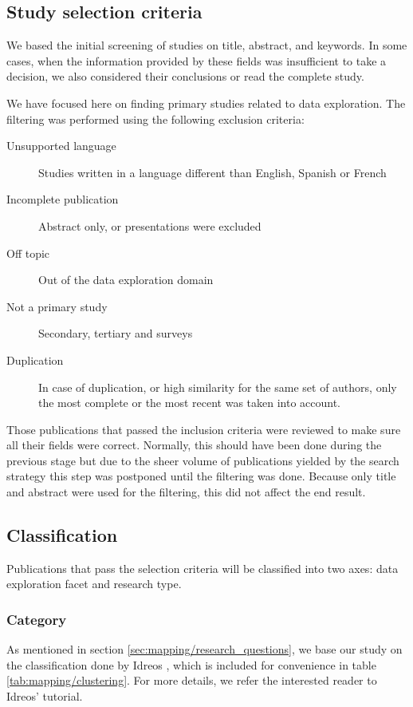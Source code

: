 
\subsection{Study selection criteria}
We based the initial screening of studies on title, abstract, and keywords.
In some cases, when the information provided by these fields was
insufficient to take a decision, we also considered their conclusions
or read the complete study.

We have focused here on finding primary studies related to data exploration.
The filtering was performed using the following exclusion criteria:

\begin{description}
  \item[Unsupported language] Studies written in a language different than
  English, Spanish or French
  \item[Incomplete publication] Abstract only, or presentations were excluded
  \item[Off topic] Out of the data exploration domain
  \item[Not a primary study] Secondary, tertiary and surveys
  \item[Duplication] In case of duplication, or high similarity for the same
  set of authors, only the most complete or the most recent was
  taken into account.
\end{description}

Those publications that passed the inclusion criteria were reviewed to make
sure all their fields were correct. Normally, this should have been done during
the previous stage but due to the sheer volume of publications yielded by the
search strategy this step was postponed until the filtering was done. Because only
title and abstract were used for the filtering, this did not affect the end
result.

\subsection{Classification}
Publications that pass the selection criteria will be classified into two axes:
data exploration facet and research type.

\subsubsection{Category}
As mentioned in section \ref{sec:mapping/research_questions}, we base our study on
the classification done by Idreos \etal \cite{Idreos2015}, which is included for
convenience in table \ref{tab:mapping/clustering}. For more details, we refer the
interested reader to Idreos' tutorial.

